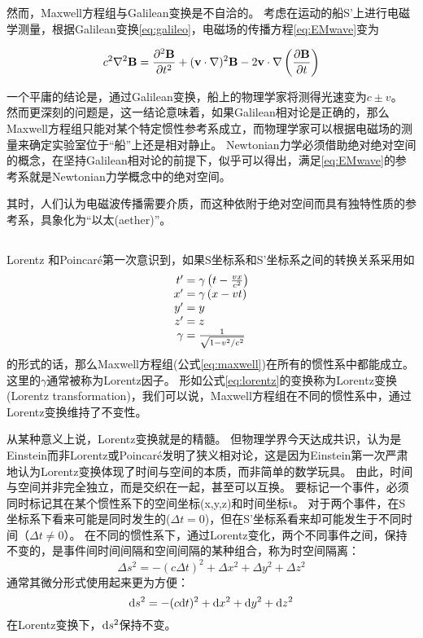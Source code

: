 然而，Maxwell方程组与Galilean变换是不自洽的。
考虑在运动的船S'上进行电磁学测量，根据Galilean变换\ref{eq:galileo}，电磁场的传播方程\ref{eq:EMwave}变为

\begin{equation}
c^2\nabla^2 \textbf B = \frac{\partial^2 \textbf B}{\partial t^2} + (\textbf v \cdot \nabla)^2 \textbf B - 2 \textbf v \cdot \nabla \left(\frac{\partial \textbf B}{\partial t}\right)
\end{equation}

一个平庸的结论是，通过Galilean变换，船上的物理学家将测得光速变为$c\pm v$。
然而更深刻的问题是，这一结论意味着，如果Galilean相对论是正确的，那么Maxwell方程组只能对某个特定惯性参考系成立，而物理学家可以根据电磁场的测量来确定实验室位于“船”上还是相对静止。
Newtonian力学必须借助绝对绝对空间的概念，在坚持Galilean相对论的前提下，似乎可以得出，满足\ref{eq:EMwave}的参考系就是Newtonian力学概念中的绝对空间。

其时，人们认为电磁波传播需要介质，而这种依附于绝对空间而具有独特性质的参考系，具象化为“以太(aether)”\cite{Yu:EleDyn1997}。

\subsection{\SR}
Lorentz 和Poincar{\'e}第一次意识到，如果S坐标系和S'坐标系之间的转换关系采用如
\begin{equation}
\begin{array}{r@{}l}
t'&{}=\gamma \left(t-{\frac {vx}{c^{2}}}\right)\\
x'&{}=\gamma \left(x-vt\right)\\
y'&{}=y\\
z'&{}=z\\
  \gamma &{}= \frac{1}{{\sqrt {1-v^{2}/c^{2}}}}
\end{array}\label{eq:lorentz}
\end{equation}
的形式的话，那么Maxwell方程组(公式\ref{eq:maxwell})在所有的惯性系中都能成立。
这里的$\gamma$通常被称为Lorentz因子。
形如公式\ref{eq:lorentz}的变换称为Lorentz变换(Lorentz transformation)，我们可以说，Maxwell方程组在不同的惯性系中，通过Lorentz变换维持了不变性。

从某种意义上说，Lorentz变换就是\SR 的精髓。
但物理学界今天达成共识，认为是Einstein而非Lorentz或Poincar{\'e}发明了狭义相对论，这是因为Einstein第一次严肃地认为Lorentz变换体现了时间与空间的本质，而非简单的数学玩具。
由此，时间与空间并非完全独立，而是交织在一起，甚至可以互换。
要标记一个事件，必须同时标记其在某个惯性系下的空间坐标(x,y,z)和时间坐标t。
对于两个事件，在S坐标系下看来可能是同时发生的($\Delta t=0$)，但在S'坐标系看来却可能发生于不同时间（$\Delta t \neq 0$）。
在不同的惯性系下，通过Lorentz变化，两个不同事件之间，保持不变的，是事件间时间间隔和空间间隔的某种组合，称为时空间隔离：
\begin{equation}\label{eq:STinterval}
  \Delta s^2 = - (c\Delta t)^2+ \Delta x ^2 + \Delta y^2+ \Delta z^2
\end{equation}
通常其微分形式使用起来更为方便：
\begin{equation}\label{eq:STinterval_diff}
  {\rm d}s^2 = - (c{\rm d}t)^2+ {\rm d}x ^2 + {\rm d} y^2+ {\rm d} z^2
\end{equation}
在Lorentz变换下，${\rm d}s^2$保持不变。


